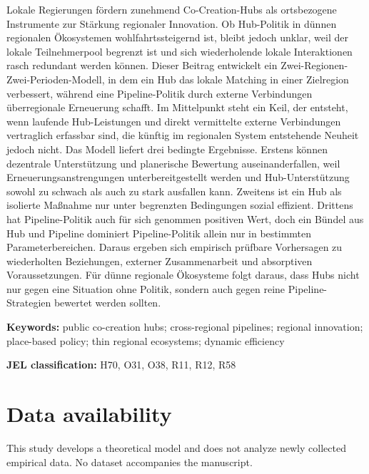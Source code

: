 \documentclass[12pt]{article}
\theoremstyle{plain}
\theoremstyle{remark}
\newcommand{\JELcodes}{H70, O31, O38, R11, R12, R58}
\newcommand{\keywordslist}{public co-creation hubs; cross-regional pipelines; regional innovation; place-based policy; thin regional ecosystems; dynamic efficiency}
\begin{document}
\noindent
Lokale Regierungen f\"ordern zunehmend Co-Creation-Hubs als ortsbezogene Instrumente zur St\"arkung regionaler Innovation. Ob Hub-Politik in d\"unnen regionalen \"Oko\-systemen wohlfahrts\-steigernd ist, bleibt jedoch unklar, weil der lokale Teilnehmerpool begrenzt ist und sich wiederholende lokale Interaktionen rasch redundant werden k\"onnen. Dieser Beitrag entwickelt ein Zwei-Regionen-Zwei-Perioden-Modell, in dem ein Hub das lokale Matching in einer Zielregion verbessert, w\"ahrend eine Pipeline-Politik durch externe Verbindungen \"uberregionale Erneuerung schafft. Im Mittelpunkt steht ein Keil, der entsteht, wenn laufende Hub-Leistungen und direkt vermittelte externe Verbindungen vertraglich erfassbar sind, die k\"unftig im regionalen System entstehende Neuheit jedoch nicht. Das Modell liefert drei bedingte Ergebnisse. Erstens k\"onnen dezentrale Unterst\"utzung und planerische Bewertung auseinanderfallen, weil Erneuerungsanstrengungen unterbereitgestellt werden und Hub-Unterst\"utzung sowohl zu schwach als auch zu stark ausfallen kann. Zweitens ist ein Hub als isolierte Ma{\ss}nahme nur unter begrenzten Bedingungen sozial effizient. Drittens hat Pipeline-Politik auch f\"ur sich genommen positiven Wert, doch ein B\"undel aus Hub und Pipeline dominiert Pipeline-Politik allein nur in bestimmten Parameterbereichen. Daraus ergeben sich empirisch pr\"ufbare Vorhersagen zu wiederholten Beziehungen, externer Zusammenarbeit und absorptiven Voraussetzungen. F\"ur d\"unne regionale \"Okosysteme folgt daraus, dass Hubs nicht nur gegen eine Situation ohne Politik, sondern auch gegen reine Pipeline-Strategien bewertet werden sollten.

\vspace{0.8em}
\noindent\textbf{Keywords:} \keywordslist

\vspace{0.35em}
\noindent\textbf{JEL classification:} \JELcodes

\vspace{1.0em}











\section*{Data availability}
This study develops a theoretical model and does not analyze newly collected empirical data. No dataset accompanies the manuscript.
\end{document}
